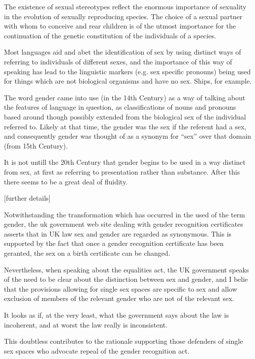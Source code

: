 \documentclass[10pt,titlepage]{article}
\begin{document}
The existence of sexual stereotypes reflect the enormous importance of sexuality in the evolution of sexually reproducing species.
The choice of a sexual partner with whom to conceive and rear children is of the utmost importance for the continuation of the genetic constitution of the individuals of a species.

Most languages aid and abet the identification of sex by using distinct ways of referring to individuals of different sexes, and the importance of this way of speaking has lead to the linguistic markers (e.g. sex specific pronouns) being used for things which are not biological organisms and have no sex.
Ships, for example.

The word gender came into use (in the 14th Century) as a way of talking about the features of language in question, as classifications of nouns and pronouns based around though possibly extended from the biological sex of the individual referred to.
Likely at that time, the gender was the sex if the referent had a sex, and consequently gender was thought of as a synonym for ``sex'' over that domain (from 15th Century).

It is not untill the 20th Century that gender begins to be used in a way distinct from sex, at first as referring to presentation rather than substance.
After this there seems to be a great deal of fluidity.

[further details]

Notwithstanding the transformation which has occurred in the used of the term gender, the uk government web site dealing with gender recognition certificates asserts that in UK law sex and gender are regarded as synonymous.
This is supported by the fact that once a gender recognition certificate has been geranted, the sex on a birth certificate can be changed.

Nevertheless, when speaking about the equalities act, the UK government speaks of the need to be clear about the distinction between sex and gender, and I belie that the provisions allowing for single sex spaces are specific to sex and allow exclusion of members of the relevant gender who are not of the relevant sex.

It looks as if, at the very least, what the government says about the law is incoherent, and at worst the law really is inconsistent.

This doubtless contributes to the rationale supporting those defenders of single sex spaces who advocate repeal of the gender recognition act. 
\end{document}
